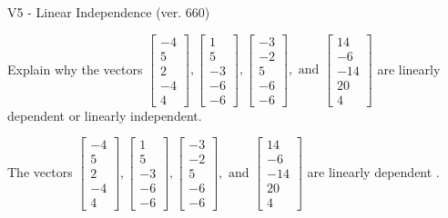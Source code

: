 \begin{exercise}
  \begin{exerciseTitle}V5 - Linear Independence (ver. 660)\end{exerciseTitle}
  \begin{exerciseStatement}
    Explain why the vectors \(\left[\begin{array}{r}
-4 \\
5 \\
2 \\
-4 \\
4
\end{array}\right] , \left[\begin{array}{r}
1 \\
5 \\
-3 \\
-6 \\
-6
\end{array}\right] , \left[\begin{array}{r}
-3 \\
-2 \\
5 \\
-6 \\
-6
\end{array}\right] , \text{ and } \left[\begin{array}{r}
14 \\
-6 \\
-14 \\
20 \\
4
\end{array}\right]\) are linearly dependent or linearly independent.	


  \end{exerciseStatement}
  \begin{exerciseAnswer}
   The vectors \(\left[\begin{array}{r}
-4 \\
5 \\
2 \\
-4 \\
4
\end{array}\right] , \left[\begin{array}{r}
1 \\
5 \\
-3 \\
-6 \\
-6
\end{array}\right] , \left[\begin{array}{r}
-3 \\
-2 \\
5 \\
-6 \\
-6
\end{array}\right] , \text{ and } \left[\begin{array}{r}
14 \\
-6 \\
-14 \\
20 \\
4
\end{array}\right]\) are 
  	 linearly dependent  .
  


  \end{exerciseAnswer}
\end{exercise}
